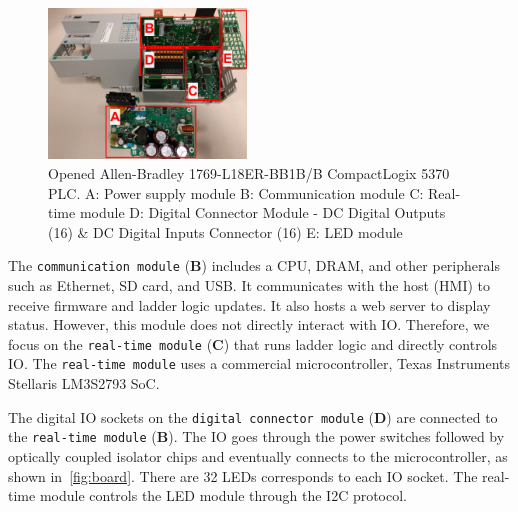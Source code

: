 \begin{figure}[tp!]
	\includegraphics[width=0.47\textwidth]{figures/modules}
	\centering
	\caption{Opened Allen-Bradley 1769-L18ER-BB1B/B CompactLogix 5370 PLC. A: Power supply module  B: Communication module  C: Real-time module  D: Digital Connector Module - DC Digital Outputs (16) \& DC Digital Inputs Connector (16)  E: LED  module}
	\label{fig:modules}
\end{figure}


The \texttt{communication module} (\textbf{B}) includes a CPU, DRAM, and other peripherals such as Ethernet, SD card, and USB. It communicates with the host (HMI) to receive firmware and ladder logic updates. It also hosts a web server to display status. However, this module does not directly interact with IO. Therefore, we focus on the \texttt{real-time module} (\textbf{C}) that runs ladder logic and directly controls IO. The \texttt{real-time module} uses a commercial microcontroller, Texas Instruments Stellaris LM3S2793 SoC. 


The digital IO sockets on the \texttt{digital connector module} (\textbf{D}) are connected to the \texttt{real-time module} (\textbf{B}). The IO goes through the power switches followed by optically coupled isolator chips and eventually connects to the microcontroller, as shown in~\autoref{fig:board}. There are 32 LEDs corresponds to each IO socket. The real-time module controls the LED module through the I2C protocol. 

